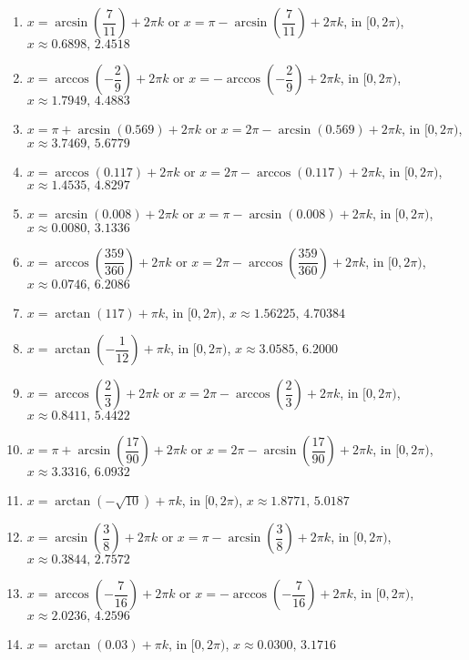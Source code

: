 \begin{enumerate}

\setcounter{enumi}{\value{HW}}

\item $x = \arcsin\left(\dfrac{7}{11}\right) + 2\pi k$ or $x = \pi - \arcsin\left(\dfrac{7}{11}\right) + 2\pi k$, in  $[0, 2\pi)$, $x \approx 0.6898, \, 2.4518$
\item $x = \arccos\left(-\dfrac{2}{9}\right) + 2\pi k$ or $x = - \arccos\left(-\dfrac{2}{9}\right) + 2\pi k$, in  $[0, 2\pi)$, $x \approx 1.7949, \, 4.4883$
\item $x = \pi + \arcsin(0.569) + 2\pi k$ or $x = 2\pi - \arcsin(0.569) + 2\pi k$, in  $[0, 2\pi)$, $x \approx 3.7469, \, 5.6779$
\item $x = \arccos(0.117) + 2\pi k$ or $x = 2\pi - \arccos(0.117) + 2\pi k$, in  $[0, 2\pi)$, $x \approx 1.4535, \, 4.8297$
\item $x = \arcsin(0.008) + 2\pi k$ or $x = \pi - \arcsin(0.008) + 2\pi k$, in  $[0, 2\pi)$, $x \approx 0.0080, \, 3.1336$
\item $x = \arccos\left(\dfrac{359}{360}\right) + 2\pi k$ or $x = 2\pi - \arccos\left(\dfrac{359}{360}\right) + 2\pi k$, in  $[0, 2\pi)$, $x \approx 0.0746, \, 6.2086$
\item $x = \arctan(117) + \pi k$, in  $[0, 2\pi)$, $x \approx 1.56225, \, 4.70384$
\item $x = \arctan\left(-\dfrac{1}{12}\right) + \pi k$, in  $[0, 2\pi)$,  $x \approx 3.0585, \, 6.2000$
\item $x = \arccos\left(\dfrac{2}{3}\right) + 2\pi k$ or $x = 2\pi - \arccos\left(\dfrac{2}{3}\right) + 2\pi k$, in  $[0, 2\pi)$, $x \approx 0.8411, \, 5.4422$
\item $x = \pi + \arcsin\left(\dfrac{17}{90}\right) + 2\pi k$ or $x = 2\pi - \arcsin\left(\dfrac{17}{90}\right) + 2\pi k$, in  $[0, 2\pi)$, $x \approx 3.3316, \, 6.0932$
\item $x = \arctan\left(-\sqrt{10}\right) + \pi k$, in  $[0, 2\pi)$, $x \approx 1.8771, \, 5.0187$
\item $x = \arcsin\left(\dfrac{3}{8}\right) + 2\pi k$ or $x = \pi - \arcsin\left(\dfrac{3}{8}\right) + 2\pi k$, in  $[0, 2\pi)$, $x \approx 0.3844, \, 2.7572$
\item $x =  \arccos\left(-\dfrac{7}{16}\right) + 2\pi k$ or $x = - \arccos\left(-\dfrac{7}{16}\right) + 2\pi k$, in  $[0, 2\pi)$, $x \approx 2.0236, \, 4.2596$
\item $x = \arctan(0.03) + \pi k$, in  $[0, 2\pi)$, $x \approx 0.0300, \, 3.1716$


\end{enumerate}
